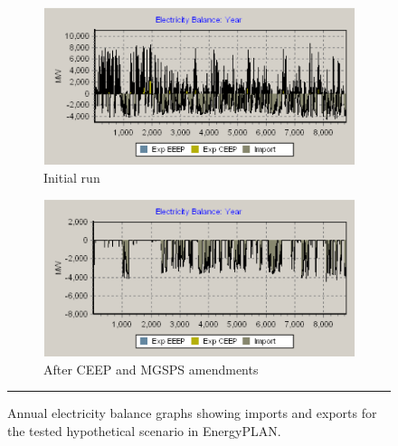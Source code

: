 \begin{figure}[htbp]
    \centering
        \begin{subfigure}{.48\textwidth}
          \centering
          \includegraphics[width=\textwidth]{figures/B15_balance.png}
          \caption{Initial run}
          \label{fig:B15_balance}
        \end{subfigure}
        \begin{subfigure}{.48\textwidth}
          \centering
          \includegraphics[width=\textwidth]{figures/B14_balance.png}
          \caption{After CEEP and MGSPS amendments}
          \label{fig:B14_balance}
        \end{subfigure}
    \rule{\textwidth}{0.5pt} %
    \caption{Annual electricity balance graphs showing imports and exports for the tested hypothetical scenario in EnergyPLAN.}
    \label{fig:B15_B14_balance}
\end{figure}